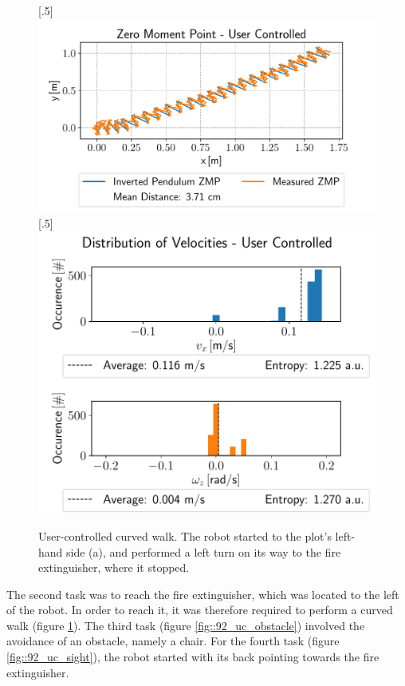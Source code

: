 \begin{figure}[h!]
	[.5\linewidth]{\includegraphics[scale=.45]{chapters/09_user_controlled_walking_experiments/img/02_test_environment/curved_walk_01_zmp.pdf}}
	[.5\linewidth]{\includegraphics[scale=.45]{chapters/09_user_controlled_walking_experiments/img/02_test_environment/curved_walk_01_entropy.pdf}}
	\caption{User-controlled curved walk. The robot started to the plot's left-hand side (a), and performed a left turn on its way to the fire extinguisher, where it stopped.}
	\label{fig::92_uc_curved}
\end{figure} 
The second task was to reach the fire extinguisher, which was located to the left of the robot. In order to reach it, it was therefore required to perform a curved walk (figure \ref{fig::92_uc_curved}). The third task (figure \ref{fig::92_uc_obstacle}) involved the avoidance of an obstacle, namely a chair. For the fourth task (figure \ref{fig::92_uc_sight}), the robot started with its back pointing towards the fire extinguisher.

